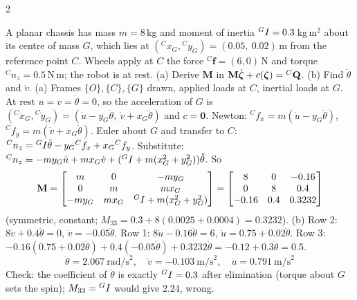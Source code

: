 \begin{multicols}{2}
\begin{examq}
A planar chassis has mass $m=8$\,kg and moment of inertia ${}^{G}I=0.3$\,kg\,m$^2$ about its centre of mass $G$, which lies at $({}^Cx_G,{}^Cy_G)=(0.05,\ 0.02)$\,m from the reference point $C$. Wheels apply at $C$ the force ${}^C\mathbf f=(6,0)$\,N and torque ${}^Cn_z=0.5$\,N\,m; the robot is at rest. (a) Derive $\mathbf M$ in $\mathbf M\dot{\boldsymbol\zeta}+c(\boldsymbol\zeta)={}^{C}\mathbf Q$. (b) Find $\ddot\theta$ and $\dot v$.
\solution
(a) Frames $\{O\},\{C\},\{G\}$ drawn, applied loads at $C$, inertial loads at $G$. At rest $u=v=\dot\theta=0$, so the acceleration of $G$ is $({}^C\ddot x_G,{}^C\ddot y_G)=(\dot u-y_G\ddot\theta,\ \dot v+x_G\ddot\theta)$ and $c=\mathbf 0$.
Newton: ${}^Cf_x=m(\dot u-y_G\ddot\theta)$, ${}^Cf_y=m(\dot v+x_G\ddot\theta)$. Euler about $G$ and transfer to $C$: ${}^Cn_z={}^{G}I\ddot\theta-y_G{}^Cf_x+x_G{}^Cf_y$. Substitute: ${}^Cn_z=-my_G\dot u+mx_G\dot v+({}^{G}I+m(x_G^2+y_G^2))\ddot\theta$. So
\[\mathbf M=\begin{bmatrix}m&0&-my_G\\0&m&mx_G\\-my_G&mx_G&{}^{G}I+m(x_G^2+y_G^2)\end{bmatrix}=\begin{bmatrix}8&0&-0.16\\0&8&0.4\\-0.16&0.4&0.3232\end{bmatrix}\]
(symmetric, constant; $M_{33}=0.3+8(0.0025+0.0004)=0.3232$).
(b) Row 2: $8\dot v+0.4\ddot\theta=0$, $\dot v=-0.05\ddot\theta$. Row 1: $8\dot u-0.16\ddot\theta=6$, $\dot u=0.75+0.02\ddot\theta$. Row 3: $-0.16(0.75+0.02\ddot\theta)+0.4(-0.05\ddot\theta)+0.3232\ddot\theta=-0.12+0.3\ddot\theta=0.5$.
\[\boxed{\ddot\theta=2.067\ \text{rad/s}^2,\quad\dot v=-0.103\ \text{m/s}^2,\quad\dot u=0.791\ \text{m/s}^2}\]
Check: the coefficient of $\ddot\theta$ is exactly ${}^{G}I=0.3$ after elimination (torque about $G$ sets the spin); $M_{33}={}^{G}I$ would give $2.24$, wrong. \chk
\end{examq}


\end{multicols}
